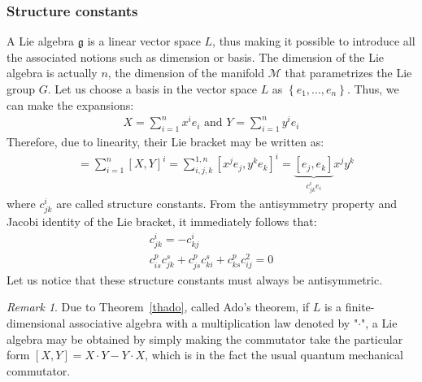 \documentclass[12pt,a4paper]{report}
\theoremstyle{definition}
\theoremstyle{remark}
\newtheorem*{remark}{Remark}
\theoremstyle{remark}
\begin{document}
\subsubsection{Structure constants}
A Lie algebra $\mathfrak{g}$ is a linear vector space $L$, thus making it possible to introduce all the associated notions such as dimension or basis. The dimension of the Lie algebra is actually $n$, the dimension of the manifold $\mathcal{M}$ that parametrizes the Lie group $G$. Let us choose a basis in the vector space $L$ as $\left\lbrace e_1,...,e_n\right\rbrace$. Thus, we can make the expansions:
\begin{align*}
X=\sum_{i=1}^nx^ie_i\text{ and }Y=\sum_{i=1}^ny^ie_i
\end{align*}
Therefore, due to linearity, their Lie bracket may be written as:
\begin{align*}
[X,Y]&=\sum_{i=1}^n[X,Y]^i=\sum_{i,j,k}^{1,n}[x^je_j,y^ke_k]^i=\underbrace{[e_j,e_k]}_{c_{jk}^ie_i}x^jy^k
\end{align*}
where $c_{jk}^i$ are called structure constants. From the antisymmetry property and Jacobi identity of the Lie bracket, it immediately follows that:
\begin{equation}\label{estructureconst}
\begin{aligned}
c_{jk}^i=-c_{kj}^i\\
c_{is}^pc_{jk}^s+c_{js}^pc_{ki}^s+c_{ks}^pc_{ij}^2=0
\end{aligned}
\end{equation}
Let us notice that these structure constants must always be antisymmetric. 
\begin{remark}Due to Theorem~\ref{thado}, called Ado's theorem, if $L$ is a finite-dimensional associative algebra with a multiplication law denoted by "$\cdot$", a Lie algebra may be obtained by simply making the commutator take the particular form $[X,Y]=X\cdot Y-Y\cdot X$, which is in the fact the usual quantum mechanical commutator.
\end{remark}
\end{document}
